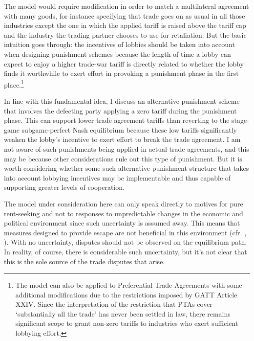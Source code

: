 \documentclass[authoryear, review]{elsarticle}
\begin{document}
The model would require modification in order to match a multilateral agreement with many goods, for instance specifying that trade goes on as usual in all those industries except the one in which the applied tariff is raised above the tariff cap and the industry the trading partner chooses to use for retaliation. But the basic intuition goes through: the incentives of lobbies should be taken into account when designing punishment schemes because the length of time a lobby can expect to enjoy a higher trade-war tariff is directly related to whether the lobby finds it worthwhile to exert effort in provoking a punishment phase in the first place.\footnote{The model can also be applied to Preferential Trade Agreements with some additional modifications due to the restrictions imposed by GATT Article XXIV. Since the interpretation of the restriction that PTAs cover `substantially all the trade' has never been settled in law, there remains significant scope to grant non-zero tariffs to industries who exert sufficient lobbying effort.}

In line with this fundamental idea, I discuss an alternative punishment scheme that involves the defecting party applying a zero tariff during the punishment phase. This can support lower trade agreement tariffs than reverting to the stage-game subgame-perfect Nash equilibrium because these low tariffs significantly weaken the lobby's incentive to exert effort to break the trade agreement. I am not aware of such punishments being applied in actual trade agreements, and this may be because other considerations rule out this type of punishment. But it is worth considering whether some such alternative punishment structure that takes into account lobbying incentives may be implementable and thus capable of supporting greater levels of cooperation.

The model under consideration here can only speak directly to motives for pure rent-seeking and not to responses to unpredictable changes in the economic and political environment since such uncertainty is assumed away. This means that measures designed to provide escape are not beneficial in this environment (cfr. \citet{bs2005}, \citet{buzard2014}). With no uncertainty, disputes should not be observed on the equilibrium path. In reality, of course, there is considerable such uncertainty, but it's not clear that this is the sole source of the trade disputes that arise.
\end{document}
